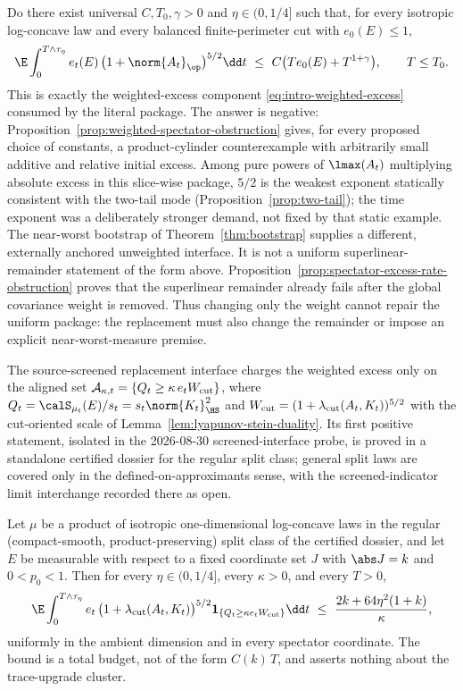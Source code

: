 \documentclass[../../main.tex]{subfiles}
\begin{document}
\begin{question}
\label{q:weighted}
Do there exist universal $C,T_0,\gamma>0$ and $\eta\in(0,1/4]$ such that, for every isotropic
log-concave law and every balanced finite-perimeter cut with $e_0(E)\le1$,
\[
  \E\int_0^{T\wedge\tau_\eta}e_t(E)\,\bigl(1+\norm{A_t}_\op\bigr)^{5/2}\dd t
  \ \le\ C\bigl(Te_0(E)+T^{1+\gamma}\bigr),\qquad T\le T_0 .
\]
This is exactly the weighted-excess component \eqref{eq:intro-weighted-excess} consumed by the
literal package. The answer is negative: Proposition~\ref{prop:weighted-spectator-obstruction}
gives, for every proposed choice of constants, a product-cylinder counterexample with
arbitrarily small additive and relative initial excess.
Among pure powers of $\lmax(A_t)$ multiplying absolute excess in this slice-wise package,
$5/2$ is the weakest exponent statically consistent with the two-tail mode
(Proposition~\ref{prop:two-tail}); the time exponent was a deliberately stronger demand,
not fixed by that static example. The near-worst bootstrap of Theorem~\ref{thm:bootstrap}
supplies a different, externally anchored unweighted interface. It is not a uniform
superlinear-remainder statement of the form above.
Proposition~\ref{prop:spectator-excess-rate-obstruction} proves that the superlinear remainder
already fails after the global covariance weight is removed. Thus changing only the weight
cannot repair the uniform package: the replacement must also change the remainder or impose an
explicit near-worst-measure premise.
\end{question}

The source-screened replacement interface charges the weighted excess only on the aligned set
$\mathcal A_{\kappa,t}=\{Q_t\ge\kappa\,e_tW_{\rm cut}\}$, where
$Q_t=\calS_{\mu_t}(E)/s_t=s_t\norm{K_t}_{\HS}^2$ and
$W_{\rm cut}=(1+\lambda_{\rm cut}(A_t,K_t))^{5/2}$ with the cut-oriented scale of
Lemma~\ref{lem:lyapunov-stein-duality}. Its first positive statement, isolated in the
2026-08-30 screened-interface probe, is proved in a standalone certified dossier for the
regular split class; general split laws are covered only in the defined-on-approximants sense,
with the screened-indicator limit interchange recorded there as open.

\begin{proposition}
\label{prop:split-screened-supply}
Let $\mu$ be a product of isotropic one-dimensional log-concave laws in the regular
(compact-smooth, product-preserving) split class of the certified dossier, and let $E$ be
measurable with respect to a fixed coordinate set $J$ with $\abs J=k$ and $0<p_0<1$. Then for
every $\eta\in(0,1/4]$, every $\kappa>0$, and every $T>0$,
\[
  \E\int_0^{T\wedge\tau_\eta}
  e_t\,\bigl(1+\lambda_{\rm cut}(A_t,K_t)\bigr)^{5/2}
  \mathbf 1_{\{Q_t\ge\kappa e_tW_{\rm cut}\}}\dd t
  \ \le\ \frac{2k+64\eta^2(1+k)}{\kappa},
\]
uniformly in the ambient dimension and in every spectator coordinate. The bound is a total
budget, not of the form $C(k)\,T$, and asserts nothing about the trace-upgrade cluster.
\end{proposition}
\end{document}
